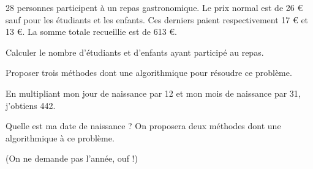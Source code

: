 \begin{enigme}

\smallskip

  \begin{minipage}{8.5cm}
    28 personnes participent à un repas gastronomique. Le prix normal
    est de 26 \euro{} sauf pour les étudiants et les enfants. Ces
    derniers paient respectivement 17 \euro{} et 13 \euro. La somme
    totale recueillie est de 613 \euro.

    Calculer le nombre d'étudiants et d'enfants ayant participé au
    repas.

    Proposer trois méthodes dont une algorithmique pour résoudre ce
    problème.
  \end{minipage}\quad
{}

\end{enigme}\vspace{0.5cm}

\begin{enigme}


En multipliant mon jour de naissance par 12 et mon mois de naissance par 31, j'obtiens 442.

Quelle est ma date de naissance ? On proposera deux méthodes dont une algorithmique à ce problème. 

(On ne demande pas l'année, ouf !)
\end{enigme}\vspace{0.5cm}

